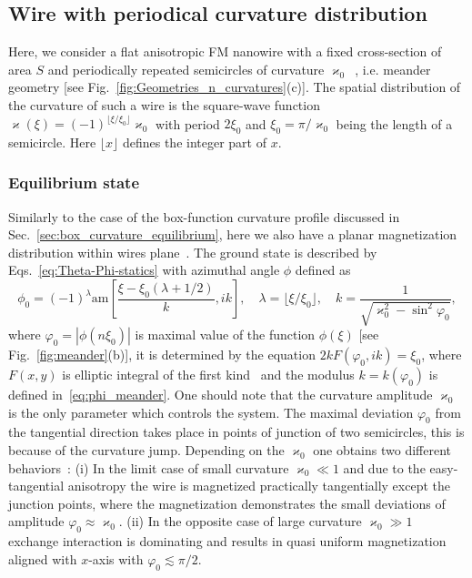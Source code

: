 \subsection{Wire with periodical curvature distribution}

Here, we consider a flat anisotropic FM nanowire with a fixed cross-section of area $S$ and periodically repeated semicircles of curvature $\varkappa_0$~\cite{Korniienko19b}, i.e. meander geometry [see Fig.~\ref{fig:Geometries_n_curvatures}(c)]. The spatial distribution of the curvature of such a wire is the square-wave function $\varkappa(\xi) = (-1)^{\lfloor\xi/\xi_0\rfloor}\varkappa_0$ with period $2\xi_0$ and $\xi_0=\pi/\varkappa_0$ being the length of a semicircle. Here $\lfloor x \rfloor$ defines the integer part of $x$.

\subsubsection{Equilibrium state}

 Similarly to the case of the box-function curvature profile discussed in Sec.~\ref{sec:box_curvature_equilibrium}, here we also have a planar magnetization distribution within wires plane~\cite{Korniienko19b}. The ground state is described by Eqs.~\eqref{eq:Theta-Phi-statics} with azimuthal angle $\phi$ defined as
\begin{equation}\label{eq:phi_meander}
\phi_0 = (-1)^\lambda \text{am}\left[\frac{\xi-\xi_0\left(\lambda+1/2\right)}{k},ik\right],\quad \lambda=\lfloor \xi/\xi_0 \rfloor,\quad k=\frac{1}{\sqrt{\varkappa_0^2-\sin^2\varphi_0}},
\end{equation}
where $\varphi_0=|\phi\left(n\xi_0\right)|$ is maximal value of the function $\phi(\xi)$ [see Fig.~\ref{fig:meander}(b)], it is determined by the equation $2kF(\varphi_0,ik) = \xi_0$, where $F(x,y)$ is elliptic integral of the first kind~\cite{NIST10} and the modulus $k = k(\varphi_0)$ is defined in~\eqref{eq:phi_meander}. One should note that the curvature amplitude $\varkappa_0$ is the only parameter which controls the system. The maximal deviation $\varphi_0$ from the tangential direction takes place in points of junction of two semicircles, this is because of the curvature jump. Depending on the $\varkappa_0$ one obtains two different behaviors~\cite{Korniienko19b}: (i) In the limit case of small curvature $\varkappa_0\ll1$ and due to the easy-tangential anisotropy the wire is magnetized practically tangentially except the junction points, where the magnetization demonstrates the small deviations of amplitude $\varphi_0\approx\varkappa_0$. (ii) In the opposite case of large curvature $\varkappa_0\gg1$ exchange interaction is dominating and results in quasi uniform magnetization aligned with $x$-axis with $\varphi_0\lesssim\pi/2$.

